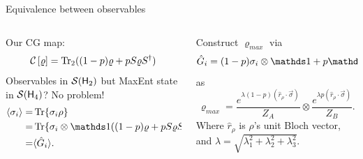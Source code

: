 \begin{frame}{Equivalence between observables}
    \begin{columns}
        \begin{column}{0.5\textwidth}
            Our CG map:
            \begin{equation*}
                \mathcal{C}\left[\varrho\right]=\Tr_{2}((1-p)\varrho+pS\varrho S^{\dag})
            \end{equation*}
            Observables in $\mathcal{S}({\sf H}_{2})$ but MaxEnt state in $\mathcal{S}({\sf H}_{4})$? No problem!
            \begin{align*}
                \langle \sigma_{i}\rangle=&\Tr{\sigma_{i} \rho}\\
                =&\Tr{\sigma_{i}\otimes\Id((1-p)\varrho+pS\varrho S)}\\
                =&\langle \hat{G}_{i}\rangle.
            \end{align*}
        \end{column}
        \begin{column}{0.5\textwidth}
            Construct $\varrho_{max}$ via
            \begin{equation*}
                \hat{G}_{i}=(1-p)\sigma_{i}\otimes\Id+p\Id\otimes\sigma_{i}.
            \end{equation*}
            as
            \begin{equation*}
                \varrho_{max}=\frac{e^{\lambda (1-p)(\hat{r}_{\rho}\cdot\vec{\sigma})}}{Z_{A}} \otimes \frac{e^{\lambda p(\hat{r}_{\rho}\cdot\vec{\sigma})}}{Z_{B}}.
            \end{equation*}
            Where $\hat{r}_{\rho}$ is $\rho$'s unit Bloch vector, and $\lambda=\sqrt{\lambda^{2}_{1}+\lambda^{2}_{2}+\lambda^{2}_{3}}$.
        \end{column}
    \end{columns}
\end{frame}

